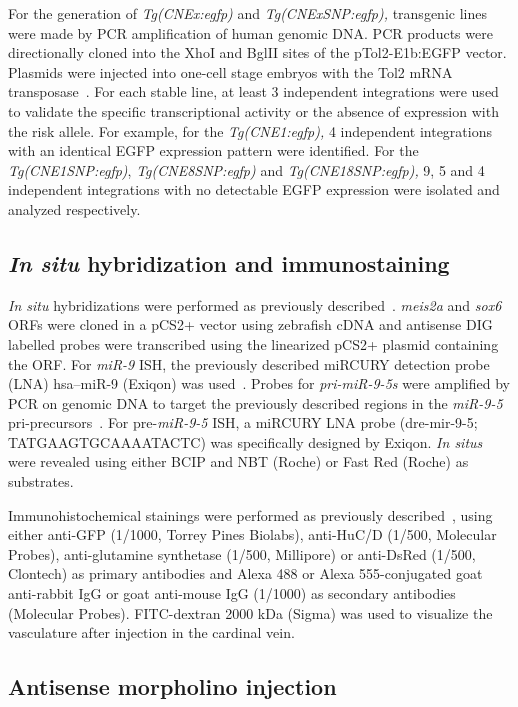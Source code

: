For the generation of \emph{Tg(CNEx:egfp)} and \emph{Tg(CNExSNP:egfp),}
transgenic lines were made by PCR amplification of human genomic DNA.
PCR products were directionally cloned into the XhoI and BglII sites of
the pTol2-E1b:EGFP vector. Plasmids were injected into one-cell stage
embryos with the Tol2 mRNA transposase~\citep{Kwan:2007kh}. For each stable line,
at least 3 independent integrations were used to validate the specific
transcriptional activity or the absence of expression with the risk
allele. For example, for the \emph{Tg(CNE1:egfp),} 4 independent
integrations with an identical EGFP expression pattern were identified.
For the \emph{Tg(CNE1SNP:egfp)}, \emph{Tg(CNE8SNP:egfp)} and
\emph{Tg(CNE18SNP:egfp),} 9, 5 and 4 independent integrations with no
detectable EGFP expression were isolated and analyzed respectively.

\subsection{\emph{In situ} hybridization and immunostaining}

\emph{In situ} hybridizations were performed as previously described~\citep{Oxtoby:1993um}. \emph{meis2a}
and \emph{sox6} ORFs were cloned in a pCS2+ vector using zebrafish cDNA
and antisense DIG labelled probes were transcribed using the linearized
pCS2+ plasmid containing the ORF. For \emph{miR-9} ISH, the previously
described miRCURY detection probe (LNA) hsa--miR-9 (Exiqon) was used~\citep{Leucht:2008ha}. Probes for
\emph{pri-miR-9-5s} were amplified by PCR on genomic DNA to target the
previously described regions in the \emph{miR-9-5} pri-precursors~\citep{Nepal:2016hm}. For
pre-\emph{miR-9-5} ISH, a miRCURY LNA probe (dre-mir-9-5;
TATGAAGTGCAAAATACTC) was specifically designed by Exiqon. \emph{In
situs} were revealed using either BCIP and NBT (Roche) or Fast Red
(Roche) as substrates.

Immunohistochemical stainings were performed as previously described~\citep{Masai:1997eu}, using either
anti-GFP (1/1000, Torrey Pines Biolabs), anti-HuC/D (1/500, Molecular
Probes), anti-glutamine synthetase (1/500, Millipore) or anti-DsRed
(1/500, Clontech) as primary antibodies and Alexa 488 or Alexa
555-conjugated goat anti-rabbit IgG or goat anti-mouse IgG (1/1000) as
secondary antibodies (Molecular Probes). FITC-dextran 2000 kDa (Sigma)
was used to visualize the vasculature after injection in the cardinal
vein.

\subsection{Antisense morpholino injection}

